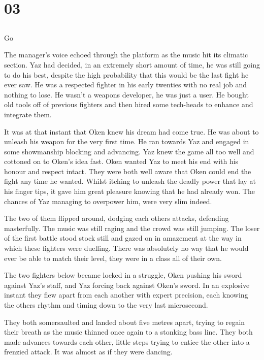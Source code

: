 \chapter{03}
\section{}
	Go  

The manager's voice echoed through the platform as the music hit its climatic section.  Yaz had decided, in an extremely short amount of time, he was still going to do his best, despite the high probability that this would be the last fight he ever saw.  He was a respected fighter in his early twenties with no real job and nothing to lose.  He wasn't a weapons developer, he was just a user.  He bought old tools off of previous fighters and then hired some tech-heads to enhance and integrate them.

It was at that instant that Oken knew his dream had come true.  He was about to unleash his weapon for the very first time.  He ran towards Yaz and engaged in some showmanship blocking and advancing.  Yaz knew the game all too well and cottoned on to Oken's idea fast.  Oken wanted Yaz to meet his end with his honour and respect intact.  They were both well aware that Oken could end the fight any time he wanted.  Whilst itching to unleash the deadly power that lay at his finger tips, it gave him great pleasure knowing that he had already won.  The chances of Yaz managing to overpower him, were very slim indeed.

The two of them flipped around, dodging each others attacks, defending masterfully.  The music was still raging and the crowd was still jumping.  The loser of the first battle stood stock still and gazed on in amazement at the way in which these fighters were duelling.  There was absolutely no way that he would ever be able to match their level, they were in a class all of their own.  

The two fighters below became locked in a struggle,  Oken pushing his sword against Yaz's staff, and Yaz forcing back against Oken's sword.  In an explosive instant they flew apart from each another with expert precision, each knowing the others rhythm and timing down to the very last microsecond.  

They both somersaulted and landed about five metres apart, trying to regain their breath as the music thinned once again to a stonking bass line.  They both made advances towards each other, little steps trying to entice the other into a frenzied attack.  It was almost as if they were dancing.  

